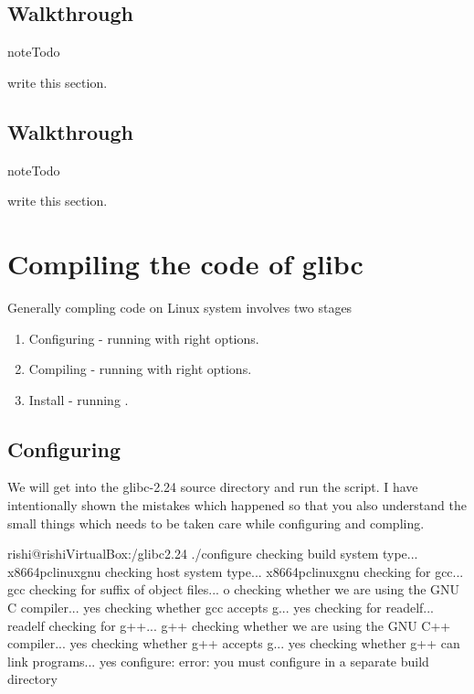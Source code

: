 \documentclass[letterpaper,10pt,english]{sphinxmanual}
\begin{document}
\subsection{Walkthrough }
\label{\detokenize{03_glibc:walkthrough-div}}
\begin{sphinxadmonition}{note}{Todo}

write this section.
\end{sphinxadmonition}


\subsection{Walkthrough }
\label{\detokenize{03_glibc:walkthrough-open}}
\begin{sphinxadmonition}{note}{Todo}

write this section.
\end{sphinxadmonition}


\section{Compiling the code of glibc}
\label{\detokenize{03_glibc:compiling-the-code-of-glibc}}
Generally compling code on Linux system involves two stages
\begin{enumerate}
\item {} 
Configuring -   running  with right options.

\item {} 
Compiling   -   running  with right options.

\item {} 
Install     -   running .

\end{enumerate}


\subsection{Configuring}
\label{\detokenize{03_glibc:configuring}}
We will get into the glibc-2.24 source directory and run the  script. I have intentionally shown the mistakes which happened so that you also understand the small things which needs to be taken care while configuring and compling.

\begin{sphinxVerbatim}[commandchars=\\\{\}]
rishi@rishi\PYGZhy{}VirtualBox:\PYGZti{}/glibc\PYGZhy{}2.24\PYGZdl{} ./configure
checking build system type... x86\PYGZus{}64\PYGZhy{}pc\PYGZhy{}linux\PYGZhy{}gnu
checking host system type... x86\PYGZus{}64\PYGZhy{}pc\PYGZhy{}linux\PYGZhy{}gnu
checking for gcc... gcc
checking for suffix of object files... o
checking whether we are using the GNU C compiler... yes
checking whether gcc accepts \PYGZhy{}g... yes
checking for readelf... readelf
checking for g++... g++
checking whether we are using the GNU C++ compiler... yes
checking whether g++ accepts \PYGZhy{}g... yes
checking whether g++ can link programs... yes
configure: error: you must configure in a separate build directory
\end{sphinxVerbatim}
\end{document}
